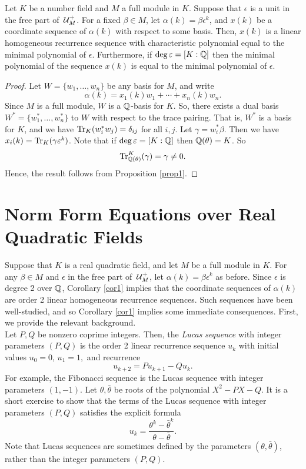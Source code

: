 \documentclass[11pt]{amsart}
\begin{document}
\begin{cor} \label{cor1} Let $K$ be a number field and $M$ a full module in $K$. Suppose that $\epsilon$ is a unit in the free part of $\,\mathcal{U}_M^+$. For a fixed $\beta \in M$, let $\alpha(k)=\beta \epsilon^k$, and $x(k)$ be a coordinate sequence of $\alpha(k)$ with respect to some basis. Then, $x(k)$ is a linear homogeneous recurrence sequence with characteristic polynomial equal to the minimal polynomial of $\epsilon$. Furthermore, if $\deg\varepsilon=[K: \mathbb{Q}]$ then the minimal polynomial of the sequence $x(k)$ is equal to the minimal polynomial of $\epsilon$.
\begin{proof}
Let $W=\{w_1, \dots, w_n\}$ be any basis for $M$, and write
\[\alpha(k)=x_1(k)w_1+\cdots+x_n(k)w_n.\]
Since $M$ is a full module, $W$ is a $\mathbb{Q}$-basis for $K$. So, there exists a dual basis $W^*=\{w_1^*, \dots, w_n^*\}$ to $W$ with respect to the trace pairing. That is, $W^*$ is a basis for $K$, and we have $\operatorname{Tr}_K(w_i^* w_j)=\delta_{ij}$
for all $i, j$. Let $\gamma=w_i^* \beta$. Then we have $x_i(k)=\operatorname{Tr}_K(\gamma \varepsilon^k)$. Note that if $\deg \varepsilon=[K: \mathbb{Q}]$ then $\mathbb{Q}(\theta)=K$. So \[\operatorname{Tr}_{\mathbb{Q}(\theta)}^K(\gamma)=\gamma\not=0.\] 
Hence, the result follows from Proposition \ref{prop1}.
\end{proof}
\end{cor}



\section{Norm Form Equations over Real Quadratic Fields}

Suppose that $K$ is a real quadratic field, and let $M$ be a full module in $K$. For any $\beta \in M$ and $\epsilon$ in the free part of $\,\mathcal{U}_M^+$, let $\alpha(k)=\beta \epsilon^k$ as before. Since $\epsilon$ is degree 2 over $\mathbb{Q}$, Corollary \ref{cor1} implies that the coordinate sequences of $\alpha(k)$ are order 2 linear homogeneous recurrence sequences. Such sequences have been well-studied, and so Corollary \ref{cor1} implies some immediate consequences. First, we provide the relevant background.\\

Let $P, Q$ be nonzero coprime integers. Then, the \textit{Lucas sequence} with integer parameters $(P, Q)$ is the order 2 linear recurrence sequence $u_k$ with initial values $u_0=0$, $u_1=1,$ and recurrence
\[u_{k+2}=Pu_{k+1}-Qu_k.\]
For example, the Fibonacci sequence is the Lucas sequence with integer parameters $(1, -1)$. Let $\theta, \bar{\theta}$ be roots of the polynomial $X^2-PX-Q$. It is a short exercise to show that the terms of the Lucas sequence with integer parameters $(P, Q)$ satisfies the explicit formula
\[u_k=\frac{\theta^k-\bar{\theta}^k}{\theta-\bar{\theta}}.\]
Note that Lucas sequences are sometimes defined by the parameters $(\theta, \bar{\theta})$, rather than the integer parameters $(P, Q)$.\\
\end{document}
